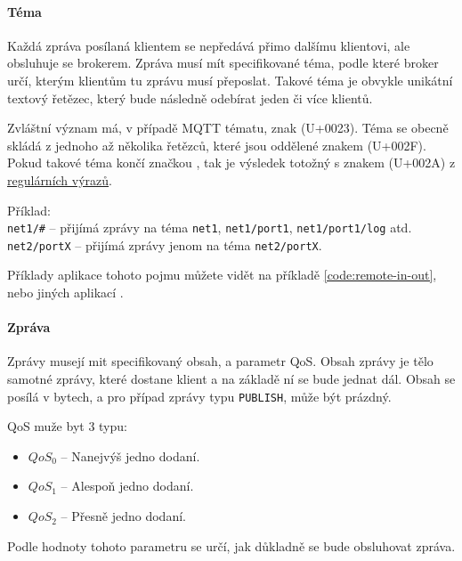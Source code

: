 \paragraph{Téma}
\label{par:topic}

Každá zpráva posílaná klientem se nepředává přimo dalšímu klientovi, ale obsluhuje se brokerem. Zpráva musí mít specifikované téma, podle které broker určí, kterým klientům tu zprávu musí přeposlat. Takové téma je obvykle unikátní textový řetězec, který bude následně odebírat jeden či více klientů.

Zvláštní význam má, v případě MQTT tématu, znak \uv{\#} (U+0023). Téma se obecně skládá z jednoho až několika řetězců, které jsou oddělené znakem \uv{/} (U+002F). Pokud takové téma končí značkou \uv{\#}, tak je výsledek totožný s  znakem \uv{*} (U+002A) z \href{https://en.wikipedia.org/wiki/Regular_expression}{regulárních výrazů}.

\begin{tabbing}
Příklad: \= \\
\> \texttt{net1/\#} -- přijímá zprávy na téma \texttt{net1}, \texttt{net1/port1}, \texttt{net1/port1/log} atd.\\
\> \texttt{net2/portX} -- přijímá zprávy jenom na téma \texttt{net2/portX}. \\
\end{tabbing}

Příklady aplikace tohoto pojmu můžete vidět na příkladě \ref{code:remote-in-out}, nebo jiných aplikací \todo{}.

\paragraph{Zpráva}
\label{par:message}

Zprávy musejí mit specifikovaný obsah, a parametr QoS. Obsah zprávy je tělo samotné zprávy, které dostane klient a na základě ní se bude jednat dál. Obsah se posílá v bytech, a pro případ zprávy typu \texttt{PUBLISH}, může být prázdný.

QoS muže byt 3 typu:
\begin{itemize}
 \item $QoS_0$ -- Nanejvýš jedno dodaní.
 \item $QoS_1$ -- Alespoň jedno dodaní.
 \item $QoS_2$ -- Přesně jedno dodaní.
\end{itemize}

Podle hodnoty tohoto parametru se určí, jak důkladně se bude obsluhovat zpráva.

